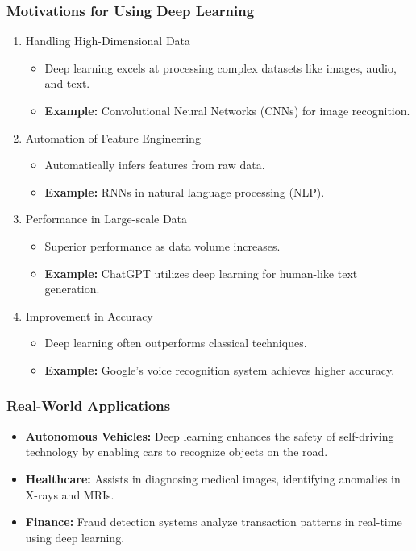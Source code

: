 \documentclass[aspectratio=169]{beamer}
\begin{document}
\begin{frame}[fragile]
    \frametitle{Motivations for Using Deep Learning}
    \begin{enumerate}
        \item Handling High-Dimensional Data
        \begin{itemize}
            \item Deep learning excels at processing complex datasets like images, audio, and text.
            \item \textbf{Example:} Convolutional Neural Networks (CNNs) for image recognition.
        \end{itemize}
        
        \item Automation of Feature Engineering
        \begin{itemize}
            \item Automatically infers features from raw data.
            \item \textbf{Example:} RNNs in natural language processing (NLP).
        \end{itemize}
        
        \item Performance in Large-scale Data
        \begin{itemize}
            \item Superior performance as data volume increases.
            \item \textbf{Example:} ChatGPT utilizes deep learning for human-like text generation.
        \end{itemize}
        
        \item Improvement in Accuracy
        \begin{itemize}
            \item Deep learning often outperforms classical techniques.
            \item \textbf{Example:} Google’s voice recognition system achieves higher accuracy.
        \end{itemize}
    \end{enumerate}
\end{frame}

\begin{frame}[fragile]
    \frametitle{Real-World Applications}
    \begin{itemize}
        \item \textbf{Autonomous Vehicles:} 
            Deep learning enhances the safety of self-driving technology by enabling cars to recognize objects on the road.
        \item \textbf{Healthcare:} 
            Assists in diagnosing medical images, identifying anomalies in X-rays and MRIs.
        \item \textbf{Finance:} 
            Fraud detection systems analyze transaction patterns in real-time using deep learning.
    \end{itemize}
\end{frame}
\end{document}
